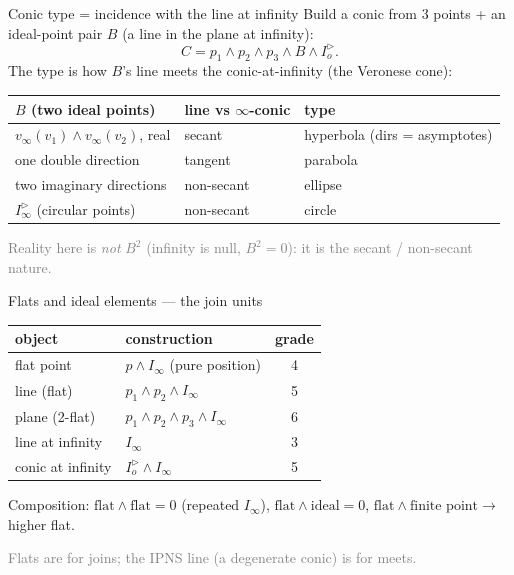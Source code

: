 \documentclass[aspectratio=169, 10pt]{beamer}
\newcommand{\Iod}{I_o^{\triangleright}}
\newcommand{\Iinfd}{I_\infty^{\triangleright}}
\newcommand{\Iinf}{I_\infty}
\newcommand{\wed}{\wedge}
\newcommand{\vinf}{v_\infty}
\begin{document}
\begin{frame}[t]{Conic type = incidence with the line at infinity}
  Build a conic from \alert{3 points + an ideal-point pair} $B$
  (a line in the plane at infinity):
  \[
    C = p_1\wed p_2\wed p_3\wed B \wed \Iod .
  \]
  The type is how $B$'s line meets the conic-at-infinity (the Veronese cone):
  \vspace{0.2cm}
  \begin{center}
  \renewcommand{\arraystretch}{1.3}
  \begin{tabular}{l l l}
    $B$ (two ideal points) & line vs $\infty$-conic & type\\
    \hline
    $\vinf(v_1)\wed\vinf(v_2)$, real & secant & \alert{hyperbola} (dirs = asymptotes)\\
    one double direction & tangent & \alert{parabola}\\
    two imaginary directions & non-secant & \alert{ellipse}\\
    $\Iinfd$ (circular points) & non-secant & \alert{circle}\\
  \end{tabular}
  \end{center}
  \vspace{0.2cm}
  \textcolor{gray}{Reality here is \emph{not} $B^2$ (infinity is null, $B^2=0$): it is the secant / non-secant nature.}
\end{frame}

\begin{frame}[t]{Flats and ideal elements --- the join units}
  \begin{center}
  \renewcommand{\arraystretch}{1.35}
  \begin{tabular}{l l c}
    object & construction & grade\\
    \hline
    flat point & $p\wed\Iinf$ (pure position) & 4\\
    line (flat) & $p_1\wed p_2\wed\Iinf$ & 5\\
    plane (2-flat) & $p_1\wed p_2\wed p_3\wed\Iinf$ & 6\\
    line at infinity & $\Iinf$ & 3\\
    conic at infinity & $\Iod\wed\Iinf$ & 5\\
  \end{tabular}
  \end{center}
  \vspace{0.3cm}
  Composition: $\text{flat}\wed\text{flat}=0$ (repeated $\Iinf$),
  $\text{flat}\wed\text{ideal}=0$, $\text{flat}\wed\text{finite point}\to$ higher flat.
  \vspace{0.15cm}

  \textcolor{gray}{Flats are for \alert{joins}; the IPNS line (a degenerate conic) is for \alert{meets}.}
\end{frame}
\end{document}
